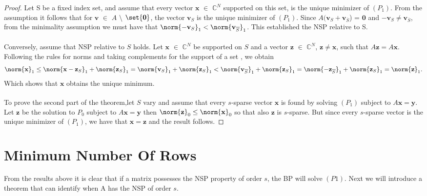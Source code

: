 \begin{proof}

Let S be a fixed index set, and assume that every vector  $\mathbf{x}$ $\in$ $\mathbb{C}^{N}$ supported on this set, is the unique minimizer of $(P_1)$. From the assumption it follows that for  $\mathbf{v}$ $\in$  $A$ $\setminus$ $\set{\mathbf{0}}$, the vector $\mathbf{v}_{S}$ is the unique minimizer of $(P_1)$. Since $A(\mathbf{v}_{S}+\mathbf{v}_{\overline{S}}$) = $\mathbf{0}$ and $\mathbf{-v}_{S} \neq \mathbf{v}_{\overline{S}}$, from the minimality assumption we must have that $\norm{ \mathbf{-v}_{S}}_{1}  <  \norm{ \mathbf{v}_{\overline{S}}}_{1}$. This established the NSP relative to S.
\\ \\
Conversely, assume that NSP relative to $S$ holds. Let $\mathbf{x}$ $\in$ $\mathbb{C}^{N}$ be supported on  $S$ and a vector $\mathbf{z}$ $\in$ $\mathbb{C}^{N}$, $\mathbf{z} \neq \mathbf{x}$, such that $A\mathbf{z} = A\mathbf{x}$. Following the rules for norms and taking complements for the support of a set , we obtain
\begin{equation*}
\norm{ \mathbf{x}}_{1} \leq \norm{ \mathbf{x} - \mathbf{z}_{S}}_{1} +  \norm{\mathbf{z}_{S}}_{1} =\norm{\mathbf{v}_{S}}_{1}  + \norm{\mathbf{z}_{S}}_{1}  <  \norm{ \mathbf{v}_{\overline{S}}}_{1} + \norm{\mathbf{z}_{S}}_{1} = \norm{ \mathbf{-z}_{\overline{S}}}_{1} + \norm{\mathbf{z}_{S}}_{1} = \norm{\mathbf{z}}_{1}.
\end{equation*}
Which shows that $\mathbf{x}$ obtains the unique minimum.
\\ \\
To prove the second part of the theorem,let $S$ vary and assume that every $s$-sparse vector  $\mathbf{x}$ is found by solving $(P_1)$ subject to $A\mathbf{x} = \mathbf{y}$. Let $\mathbf{z}$ be the solution to $P_0$ subject to  $A\mathbf{x} = \mathbf{y}$ then $\norm{\mathbf{z}}_{0} \leq \norm{\mathbf{x}}_{0}$ so that also $\mathbf{z}$ is $s$-sparse. But since every $s$-sparse vector is the unique minimizer of $(P_1)$, we have that $\mathbf{x} = \mathbf{z}$ and the result follows.
\end{proof}


\section*{Minimum Number Of Rows}

From the results above it is clear that if a matrix possesses the NSP property of order $s$, the BP will solve $(P1)$. Next we will introduce a theorem that can identify when A has the NSP of order $s$.  

